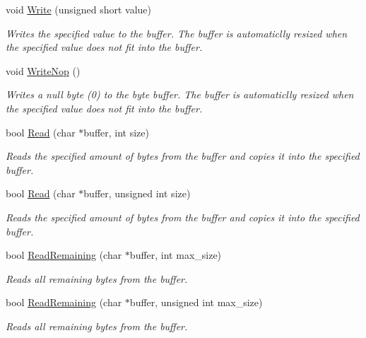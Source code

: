 \begin{DoxyCompactItemize}
void \hyperlink{class_senergy_1_1_byte_buffer_a9286d05c71ce66859098778f11be9c51}{Write} (unsigned short value)
\begin{DoxyCompactList}\small\item\em Writes the specified value to the buffer. The buffer is automaticlly resized when the specified value does not fit into the buffer. \end{DoxyCompactList}\item 
void \hyperlink{class_senergy_1_1_byte_buffer_ad810aade775871238b82deb38629510e}{Write\-Nop} ()
\begin{DoxyCompactList}\small\item\em Writes a null byte (0) to the byte buffer. The buffer is automaticlly resized when the specified value does not fit into the buffer. \end{DoxyCompactList}\item 
bool \hyperlink{class_senergy_1_1_byte_buffer_ae4e73e6e193bec7b9f7df0919d1641d9}{Read} (char $\ast$buffer, int size)
\begin{DoxyCompactList}\small\item\em Reads the specified amount of bytes from the buffer and copies it into the specified buffer. \end{DoxyCompactList}\item 
bool \hyperlink{class_senergy_1_1_byte_buffer_ace3d04d38706d534a16e596ee291630b}{Read} (char $\ast$buffer, unsigned int size)
\begin{DoxyCompactList}\small\item\em Reads the specified amount of bytes from the buffer and copies it into the specified buffer. \end{DoxyCompactList}\item 
bool \hyperlink{class_senergy_1_1_byte_buffer_a391deafd9b6e3c4b4c2b92fe78358ebf}{Read\-Remaining} (char $\ast$buffer, int max\-\_\-size)
\begin{DoxyCompactList}\small\item\em Reads all remaining bytes from the buffer. \end{DoxyCompactList}\item 
bool \hyperlink{class_senergy_1_1_byte_buffer_a8e9ec7a8d6c26c01a738768928fff704}{Read\-Remaining} (char $\ast$buffer, unsigned int max\-\_\-size)
\begin{DoxyCompactList}\small\item\em Reads all remaining bytes from the buffer. \end{DoxyCompactList}\item 

\end{DoxyCompactItemize}
